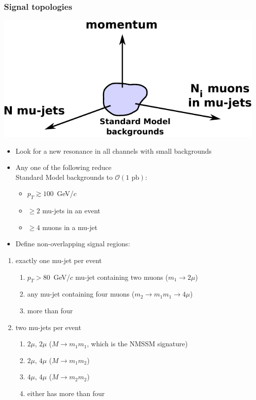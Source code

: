 \documentclass[compress]{beamer}
\begin{document}
\begin{frame}
\frametitle{Signal topologies}

\vspace{1 cm}
\hfill \includegraphics[width=0.5\linewidth]{signal_regions.pdf}

\vspace{-3.5 cm}
\begin{itemize}
\item Look for a new resonance in all channels with small backgrounds

\item Any one of the following reduce \\ Standard Model backgrounds to $\mathcal{O}(1\mbox{ pb})$:
\begin{itemize}
\item $p_T \gtrsim 100$~GeV/$c$
\item $\ge 2$ mu-jets in an event
\item $\ge 4$ muons in a mu-jet
\end{itemize}
\item Define non-overlapping signal regions:
\end{itemize}

\vspace{-0.5 cm}
\begin{center}
\begin{minipage}{0.8\linewidth}
\scriptsize
\begin{enumerate}
\item exactly one mu-jet per event
\begin{enumerate}
\item \scriptsize $p_T > 80$~GeV/$c$ mu-jet containing two muons \mbox{($m_1 \to 2\mu$)\hspace{-1 cm}}
\item \scriptsize any mu-jet containing four muons ($m_2 \to m_1 m_1 \to 4\mu$)
\item \scriptsize more than four
\end{enumerate}

\item two mu-jets per event
\begin{enumerate}
\item \scriptsize $2\mu$, $2\mu$ ($M \to m_1 m_1$, which is the NMSSM signature)
\item \scriptsize $2\mu$, $4\mu$ ($M \to m_1 m_2$)
\item \scriptsize $4\mu$, $4\mu$ ($M \to m_2 m_2$)
\item \scriptsize either has more than four
\end{enumerate}


\end{enumerate}
\end{minipage}
\end{center}
\end{frame}
\end{document}
